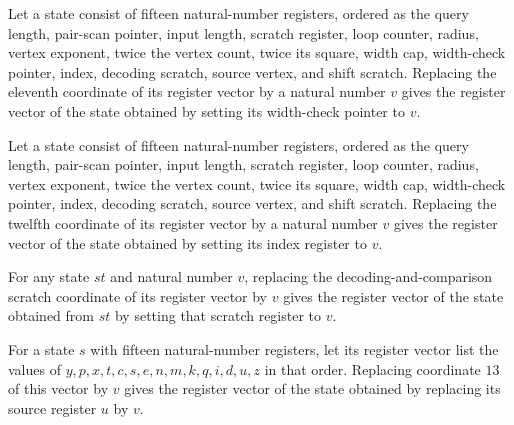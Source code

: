 \begin{lemma}
\label{Complexity.PathHard.St.upd_q}
\leanok
{}
Let a state consist of fifteen natural-number registers, ordered as the query length,
pair-scan pointer, input length, scratch register, loop counter, radius, vertex
exponent, twice the vertex count, twice its square, width cap, width-check pointer,
index, decoding scratch, source vertex, and shift scratch. Replacing the eleventh
coordinate of its register vector by a natural number $v$ gives the register vector of
the state obtained by setting its width-check pointer to $v$.
\end{lemma}

\begin{lemma}
\label{Complexity.PathHard.St.upd_i}
\leanok
{}
Let a state consist of fifteen natural-number registers, ordered as the query length,
pair-scan pointer, input length, scratch register, loop counter, radius, vertex
exponent, twice the vertex count, twice its square, width cap, width-check pointer,
index, decoding scratch, source vertex, and shift scratch. Replacing the twelfth
coordinate of its register vector by a natural number $v$ gives the register vector of
the state obtained by setting its index register to $v$.
\end{lemma}

\begin{lemma}
\label{Complexity.PathHard.St.upd_d}
\leanok
{}
For any state $st$ and natural number $v$, replacing the decoding-and-comparison scratch
coordinate of its register vector by $v$ gives the register vector of the state obtained
from $st$ by setting that scratch register to $v$.
\end{lemma}

\begin{lemma}
\label{Complexity.PathHard.St.upd_u}
\leanok
{}
For a state $s$ with fifteen natural-number registers, let its register vector list the
values of $y,p,x,t,c,s,e,n,m,k,q,i,d,u,z$ in that order. Replacing coordinate $13$ of
this vector by $v$ gives the register vector of the state obtained by replacing its
source register $u$ by $v$.
\end{lemma}


